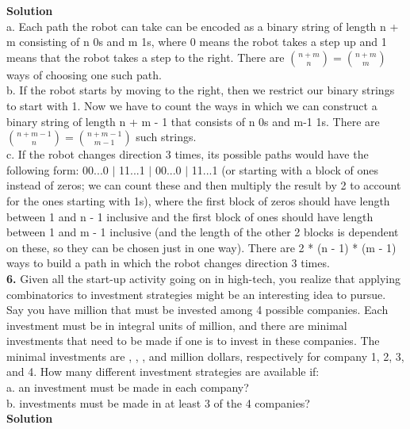 \documentclass[12pt,a4paper,oneside,draft]{report}
\begin{document}
\newpage
\textbf{Solution} \\

a. Each path the robot can take can be encoded as a binary string of length n + m consisting of n 0s and m 1s, where 0 means the robot takes a step up and 1 means that the robot takes a step to the right.
There are ${n + m \choose n} = {n + m \choose m}$ ways of choosing one such path. \\

b. If the robot starts by moving to the right, then we restrict our binary strings to start with 1. Now we have to count the ways in which we can construct a binary string of length n + m - 1 that consists of n 0s and m-1 1s. There are $ {n + m - 1 \choose n} = {n + m - 1 \choose m - 1} $ such strings. \\

c. If the robot changes direction 3 times, its possible paths would have the following form: 00...0 $\vert$ 11...1 $\vert$ 00...0 $\vert$ 11...1 (or starting with a block of ones instead of zeros; we can count these and then multiply the result by 2 to account for the ones starting with 1s), where the first block of zeros should have length between 1 and n - 1 inclusive and the first block of ones should have length between 1 and m - 1 inclusive (and the length of the other 2 blocks is dependent on these, so they can be chosen just in one way). There are 2 * (n - 1) * (m - 1) ways to build a path in which the robot changes direction 3 times. \\

\textbf{6.} Given all the start-up activity going on in high-tech, you realize that applying combinatorics to investment strategies might be an interesting idea to pursue. Say you have  million
that must be invested among 4 possible companies. Each investment must be in integral
units of  million, and there are minimal investments that need to be made if one is to
invest in these companies. The minimal investments are , , , and  million dollars,
respectively for company 1, 2, 3, and 4. How many different investment strategies are available if: \\
a. an investment must be made in each company? \\
b. investments must be made in at least 3 of the 4 companies? \\

\textbf{Solution} \\
\end{document}
